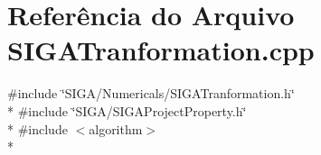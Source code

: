 \section{Referência do Arquivo S\+I\+G\+A\+Tranformation.\+cpp}
\label{_s_i_g_a_tranformation_8cpp}
{\ttfamily \#include \char`\"{}S\+I\+G\+A/\+Numericals/\+S\+I\+G\+A\+Tranformation.\+h\char`\"{}}\\*
{\ttfamily \#include \char`\"{}S\+I\+G\+A/\+S\+I\+G\+A\+Project\+Property.\+h\char`\"{}}\\*
{\ttfamily \#include $<$algorithm$>$}\\*
